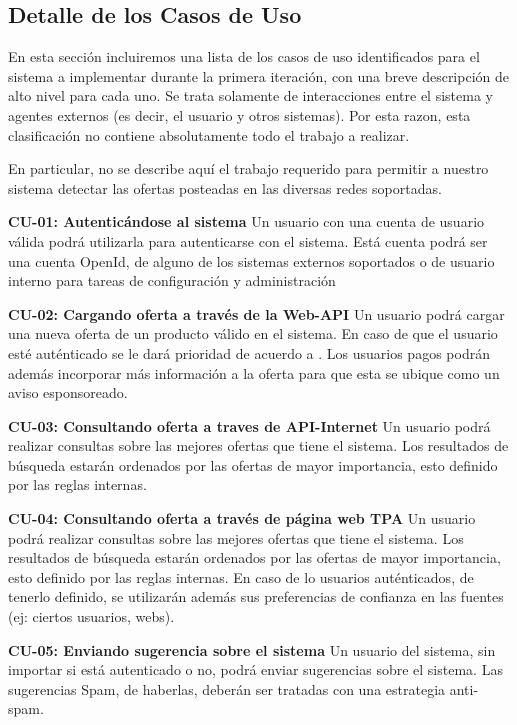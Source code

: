 \subsection*{Detalle de los Casos de Uso}

En esta sección incluiremos una lista de los casos de uso identificados para el sistema a implementar durante la primera iteración, con una breve descripción de alto nivel para cada uno. Se trata solamente de interacciones entre el sistema y agentes externos (es decir, el usuario y otros sistemas). Por esta razon, esta clasificación no contiene absolutamente todo el trabajo a realizar.  

En particular, no se describe aquí el trabajo requerido para permitir a nuestro sistema detectar las ofertas posteadas en las diversas redes soportadas. 

\textbf{CU-01: Autenticándose al sistema} Un usuario con una cuenta de usuario válida podrá utilizarla para autenticarse con el sistema. Está cuenta podrá ser una cuenta OpenId, de alguno de los sistemas externos soportados o de usuario interno para tareas de configuración y administración

\textbf{CU-02: Cargando oferta a través de la Web-API} Un usuario podrá cargar una nueva oferta de un producto válido en el sistema. En caso de que el usuario esté auténticado se le dará prioridad de acuerdo a . Los usuarios pagos podrán además incorporar más información a la oferta para que esta se ubique como un aviso esponsoreado.

\textbf{CU-03: Consultando oferta a traves de API-Internet} Un usuario podrá realizar consultas sobre las mejores ofertas que tiene el sistema. Los resultados de búsqueda estarán ordenados por las ofertas de mayor importancia, esto definido por las reglas internas.

\textbf{CU-04: Consultando oferta a través de página web TPA} Un usuario podrá realizar consultas sobre las mejores ofertas que tiene el sistema. Los resultados de búsqueda estarán ordenados por las ofertas de mayor importancia, esto definido por las reglas internas. En caso de lo usuarios auténticados, de tenerlo definido, se utilizarán además sus preferencias de confianza en las fuentes (ej: ciertos usuarios, webs).

\textbf{CU-05: Enviando sugerencia sobre el sistema} Un usuario del sistema, sin importar si está autenticado o no, podrá enviar sugerencias sobre el sistema. Las sugerencias Spam, de haberlas, deberán ser tratadas con una estrategia anti-spam.
